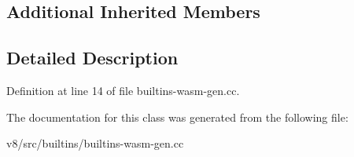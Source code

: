 \subsection*{Additional Inherited Members}


\subsection{Detailed Description}


Definition at line 14 of file builtins-\/wasm-\/gen.\+cc.



The documentation for this class was generated from the following file\+:\begin{DoxyCompactItemize}
\item 
v8/src/builtins/builtins-\/wasm-\/gen.\+cc\end{DoxyCompactItemize}

